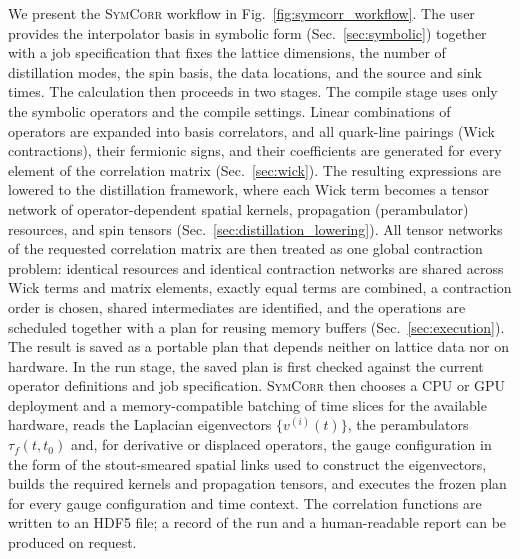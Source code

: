 \documentclass[a4paper,fleqn]{cas-dc}
\begin{document}
We present the \textsc{SymCorr} workflow in Fig.~\ref{fig:symcorr_workflow}. The user provides the interpolator basis in symbolic form (Sec.~\ref{sec:symbolic}) together with a job specification that fixes the lattice dimensions, the number of distillation modes, the spin basis, the data locations, and the source and sink times. The calculation then proceeds in two stages. The compile stage uses only the symbolic operators and the compile settings. Linear combinations of operators are expanded into basis correlators, and all quark-line pairings (Wick contractions), their fermionic signs, and their coefficients are generated for every element of the correlation matrix (Sec.~\ref{sec:wick}). The resulting expressions are lowered to the distillation framework, where each Wick term becomes a tensor network of operator-dependent spatial kernels, propagation (perambulator) resources, and spin tensors (Sec.~\ref{sec:distillation_lowering}). All tensor networks of the requested correlation matrix are then treated as one global contraction problem: identical resources and identical contraction networks are shared across Wick terms and matrix elements, exactly equal terms are combined, a contraction order is chosen, shared intermediates are identified, and the operations are scheduled together with a plan for reusing memory buffers (Sec.~\ref{sec:execution}). The result is saved as a portable plan that depends neither on lattice data nor on hardware. In the run stage, the saved plan is first checked against the current operator definitions and job specification. \textsc{SymCorr} then chooses a CPU or GPU deployment and a memory-compatible batching of time slices for the available hardware, reads the Laplacian eigenvectors $\{v^{(i)}(t)\}$, the perambulators $\tau_f(t,t_0)$ and, for derivative or displaced operators, the gauge configuration in the form of the stout-smeared spatial links used to construct the eigenvectors, builds the required kernels and propagation tensors, and executes the frozen plan for every gauge configuration and time context. The correlation functions are written to an HDF5 file; a record of the run and a human-readable report can be produced on request. 
\end{document}
